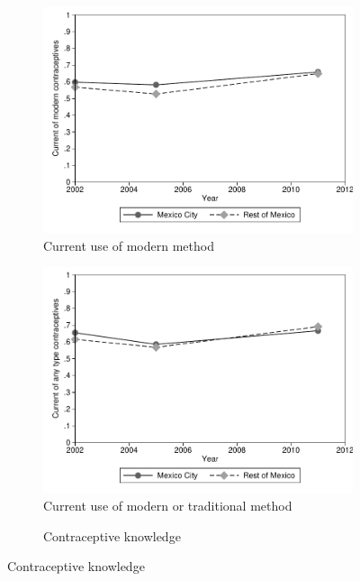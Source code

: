 \documentclass[a4paper, 11pt]{article}
\begin{document}
\begin{spacing}{1.4}
\begin{figure}[H]
  \centering	\caption{MxFLS data}
  \label{MxFLS_Graphs}
  \begin{subfigure}{.3\textwidth}
    \centering	\caption{Current use of modern method}\label{modmethod}
    \includegraphics[scale=0.3]{figures/Trend_ModMethod.pdf}
  \end{subfigure}%
  \begin{subfigure}{.3\textwidth}
    \centering\caption{Current use of modern or traditional method}\label{anymethod}
    \includegraphics[scale=0.3]{figures/Trend_AnyMethod.pdf}
  \end{subfigure}%
  \begin{subfigure}{.3\textwidth}
    \centering	\caption{Contraceptive knowledge}	\label{knowledge}

\end{subfigure}
\end{figure}
\end{spacing}
\end{document}
